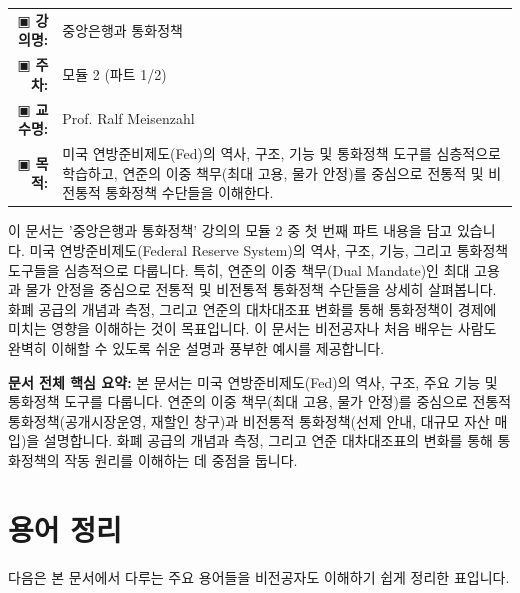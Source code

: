 \documentclass[11pt,a4paper]{article}
\makeatletter
\theoremstyle{definition}
\newcommand{\metainfo}[4]{
\begin{tcolorbox}[
    colback=lightpurple,
    colframe=darkpurple,
    boxrule=1pt,
    arc=2mm,
    left=10pt,
    right=10pt,
    top=8pt,
    bottom=8pt
]
\begin{tabular}{@{}rl@{}}
▣ \textbf{강의명:} & #1 \\[0.3em]
▣ \textbf{주차:} & #2 \\[0.3em]
▣ \textbf{교수명:} & #3 \\[0.3em]
▣ \textbf{목적:} & \begin{minipage}[t]{0.75\textwidth}#4\end{minipage}
\end{tabular}
\end{tcolorbox}
}
\makeatother
\begin{document}
\thispagestyle{firstpage}

\metainfo{중앙은행과 통화정책}{모듈 2 (파트 1/2)}{Prof. Ralf Meisenzahl}{미국 연방준비제도(Fed)의 역사, 구조, 기능 및 통화정책 도구를 심층적으로 학습하고, 연준의 이중 책무(최대 고용, 물가 안정)를 중심으로 전통적 및 비전통적 통화정책 수단들을 이해한다.}

\tableofcontents

\newpage

이 문서는 '중앙은행과 통화정책' 강의의 모듈 2 중 첫 번째 파트 내용을 담고 있습니다.
미국 연방준비제도(Federal Reserve System)의 역사, 구조, 기능, 그리고 통화정책 도구들을 심층적으로 다룹니다.
특히, 연준의 이중 책무(Dual Mandate)인 최대 고용과 물가 안정을 중심으로 전통적 및 비전통적 통화정책 수단들을 상세히 살펴봅니다.
화폐 공급의 개념과 측정, 그리고 연준의 대차대조표 변화를 통해 통화정책이 경제에 미치는 영향을 이해하는 것이 목표입니다.
이 문서는 비전공자나 처음 배우는 사람도 완벽히 이해할 수 있도록 쉬운 설명과 풍부한 예시를 제공합니다.

\vspace{1em}

\begin{summarybox}
\textbf{문서 전체 핵심 요약:}
본 문서는 미국 연방준비제도(Fed)의 역사, 구조, 주요 기능 및 통화정책 도구를 다룹니다.
연준의 이중 책무(최대 고용, 물가 안정)를 중심으로 전통적 통화정책(공개시장운영, 재할인 창구)과 비전통적 통화정책(선제 안내, 대규모 자산 매입)을 설명합니다.
화폐 공급의 개념과 측정, 그리고 연준 대차대조표의 변화를 통해 통화정책의 작동 원리를 이해하는 데 중점을 둡니다.
\end{summarybox}

\section{용어 정리}

다음은 본 문서에서 다루는 주요 용어들을 비전공자도 이해하기 쉽게 정리한 표입니다.
\end{document}
